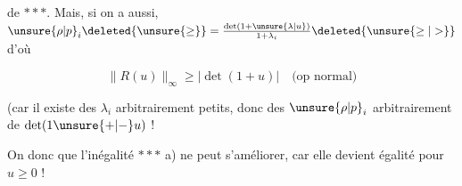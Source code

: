  de $***$. Mais, si  on a aussi,   $\unsure{\rho|p}_i\deleted{\unsure{\geq}}=\frac{\det(1+\unsure{\lambda|u})}{1+\lambda_i}\deleted{\unsure{\geq|>}}$ d'où

\[
\boxed{\|R(u)\|_\infty\geq|\det(1+u)|}\quad\text{(op normal)}
\]

(car il existe des $\lambda_i$ arbitrairement petits, donc des $\unsure{\rho|p}_i$ arbitrairement  de $\det(1\unsure{+|-}u)$ !

On   donc que l'inégalité $***$ a) ne peut s'améliorer, car elle devient égalité pour $u\geq0$ !
